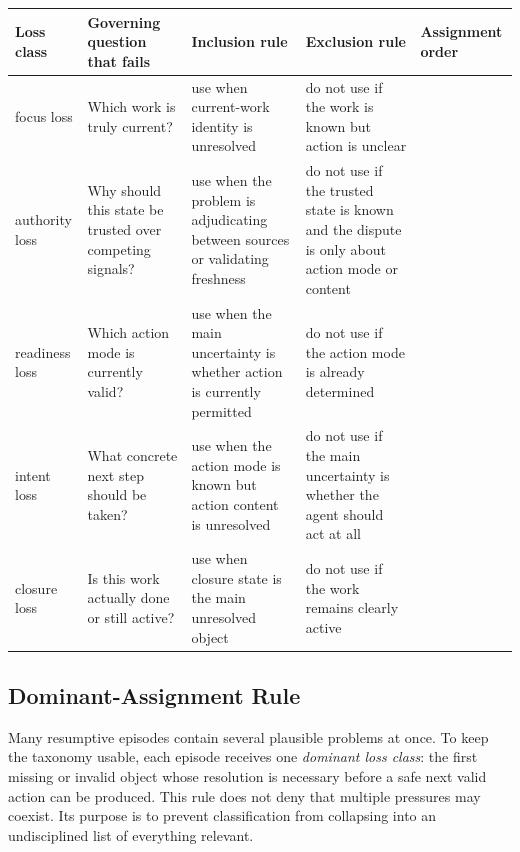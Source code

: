 \documentclass[a4paper,fleqn]{cas-dc}
\begin{document}
\begin{strip}
\captionsetup{type=table}
\label{tab:loss-classes}
\centering
\footnotesize
\setlength{\tabcolsep}{4pt}
\renewcommand{\arraystretch}{1.05}
\begin{tabularx}{\textwidth}{>{\raggedright\arraybackslash}p{} >{\raggedright\arraybackslash}p{} >{\raggedright\arraybackslash}p{} >{\raggedright\arraybackslash}p{} >{\raggedright\arraybackslash}p{}}
\toprule
Loss class & Governing question that fails & Inclusion rule & Exclusion rule & Assignment order \\
\midrule
focus loss & Which work is truly current? & use when current-work identity is unresolved & do not use if the work is known but action is unclear & 1 \\
authority loss & Why should this state be trusted over competing signals? & use when the problem is adjudicating between sources or validating freshness & do not use if the trusted state is known and the dispute is only about action mode or content & 2 \\
readiness loss & Which action mode is currently valid? & use when the main uncertainty is whether action is currently permitted & do not use if the action mode is already determined & 3 \\
intent loss & What concrete next step should be taken? & use when the action mode is known but action content is unresolved & do not use if the main uncertainty is whether the agent should act at all & 4 \\
closure loss & Is this work actually done or still active? & use when closure state is the main unresolved object & do not use if the work remains clearly active & 5 \\
\bottomrule
\end{tabularx}
\end{strip}

\subsection{Dominant-Assignment Rule}

Many resumptive episodes contain several plausible problems at once. To keep the taxonomy usable, each episode receives one \emph{dominant loss class}: the first missing or invalid object whose resolution is necessary before a safe next valid action can be produced. This rule does not deny that multiple pressures may coexist. Its purpose is to prevent classification from collapsing into an undisciplined list of everything relevant.
\end{document}

